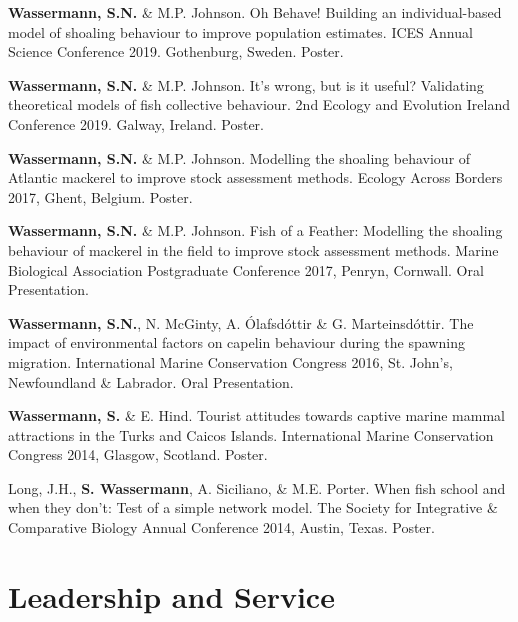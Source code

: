 \documentclass[a4paper]{deedy-resume} %
\begin{document}
\begin{flushleft}
\begin{tightitemize}
\item \textbf{Wassermann, S.N.} \& M.P. Johnson. Oh Behave! Building an individual-based model of shoaling behaviour to improve population estimates. ICES Annual Science Conference 2019. Gothenburg, Sweden. Poster.
\item \textbf{Wassermann, S.N.} \& M.P. Johnson. It's wrong, but is it useful? Validating theoretical models of fish collective behaviour. 2nd Ecology and Evolution Ireland Conference 2019. Galway, Ireland. Poster.
\item \textbf{Wassermann, S.N.} \& M.P. Johnson. Modelling the shoaling behaviour of Atlantic mackerel to improve stock assessment methods. Ecology Across Borders 2017, Ghent, Belgium. Poster.
\item \textbf{Wassermann, S.N.} \& M.P. Johnson. Fish of a Feather: Modelling the shoaling behaviour of mackerel in the field to improve stock assessment methods. Marine Biological Association Postgraduate Conference 2017, Penryn, Cornwall. Oral Presentation.
\item \textbf{Wassermann, S.N.}, N. McGinty, A. \'{O}lafsd\'{o}ttir \& G. Marteinsd\'{o}ttir. The impact of environmental factors on capelin behaviour during the spawning migration. International Marine Conservation Congress 2016, St. John's, Newfoundland \& Labrador. Oral Presentation.
\item \textbf{Wassermann, S.} \& E. Hind. Tourist attitudes towards captive marine mammal attractions in the Turks and Caicos Islands. International Marine Conservation Congress 2014, Glasgow, Scotland. Poster.
\item Long, J.H., \textbf{S. Wassermann}, A. Siciliano, \& M.E. Porter. When fish school and when they don't: Test of a simple network model. The Society for Integrative \& Comparative Biology Annual Conference 2014, Austin, Texas. Poster.
\end{tightitemize}

\sectionspace


\sectionspace

\section{Leadership and Service} 


\end{flushleft}
\end{document}
